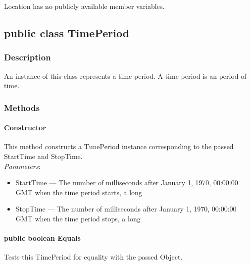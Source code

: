 \documentclass[$Date: 2003/06/26 19:29:31 $]{glabarticle}
\begin{document}
Location has no publicly available member variables. 


\newpage

\subsection{public class TimePeriod}


\subsubsection{Description}

An instance of this class represents a time period. A time period is an period of time. 


\subsubsection{Methods}

\paragraph{Constructor}

This method constructs a TimePeriod instance corresponding to the
passed StartTime and StopTime. \\

\textit{Parameters}:
\begin{itemize}
\item[] StartTime --- The number of milliseconds after January 1, 1970, 00:00:00 GMT when the 
time period starts, a long
\item[] StopTime --- The number of milliseconds after January 1, 1970, 00:00:00 GMT when the 
time period stops, a long
\end{itemize}

\paragraph{public boolean Equals}

Tests this TimePeriod for equality with the passed Object. \\
\end{document}
